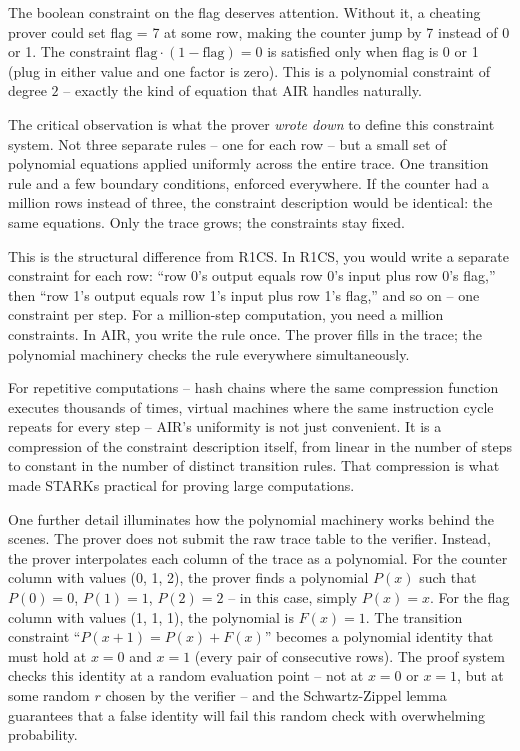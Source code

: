 \documentclass[
  11pt,
  openany]{report}
\begin{document}
The boolean constraint on the flag deserves attention. Without it, a cheating
prover could set flag = 7 at some row, making the counter jump by 7 instead of 0
or 1. The constraint \(\text{flag} \cdot (1 - \text{flag}) = 0\) is satisfied
only when flag is 0 or 1 (plug in either value and one factor is zero). This is
a polynomial constraint of degree \(2\) -- exactly the kind of equation that AIR
handles naturally.

The critical observation is what the prover \emph{wrote down} to define this
constraint system. Not three separate rules -- one for each row -- but a small
set of polynomial equations applied uniformly across the entire trace. One
transition rule and a few boundary conditions, enforced everywhere. If the
counter had a million rows instead of three, the constraint description would be
identical: the same equations. Only the trace grows; the constraints stay fixed.

This is the structural difference from R1CS. In R1CS, you would write a separate
constraint for each row: ``row 0's output equals row 0's input plus row 0's
flag,'' then ``row 1's output equals row 1's input plus row 1's flag,'' and so
on -- one constraint per step. For a million-step computation, you need a
million constraints. In AIR, you write the rule once. The prover fills in the
trace; the polynomial machinery checks the rule everywhere simultaneously.

For repetitive computations -- hash chains where the same compression function
executes thousands of times, virtual machines where the same instruction cycle
repeats for every step -- AIR's uniformity is not just convenient. It is a
compression of the constraint description itself, from linear in the number of
steps to constant in the number of distinct transition rules. That compression
is what made STARKs practical for proving large computations.

One further detail illuminates how the polynomial machinery works behind the
scenes. The prover does not submit the raw trace table to the verifier. Instead,
the prover interpolates each column of the trace as a polynomial. For the
counter column with values (0, 1, 2), the prover finds a polynomial \(P(x)\)
such that \(P(0) = 0\), \(P(1) = 1\), \(P(2) = 2\) -- in this case, simply
\(P(x) = x\). For the flag column with values (1, 1, 1), the polynomial is
\(F(x) = 1\). The transition constraint ``\(P(x+1) = P(x) + F(x)\)'' becomes a
polynomial identity that must hold at \(x = 0\) and \(x = 1\) (every pair of
consecutive rows). The proof system checks this identity at a random evaluation
point -- not at \(x = 0\) or \(x = 1\), but at some random \(r\) chosen by the
verifier -- and the Schwartz-Zippel lemma guarantees that a false identity will
fail this random check with overwhelming probability.
\end{document}
